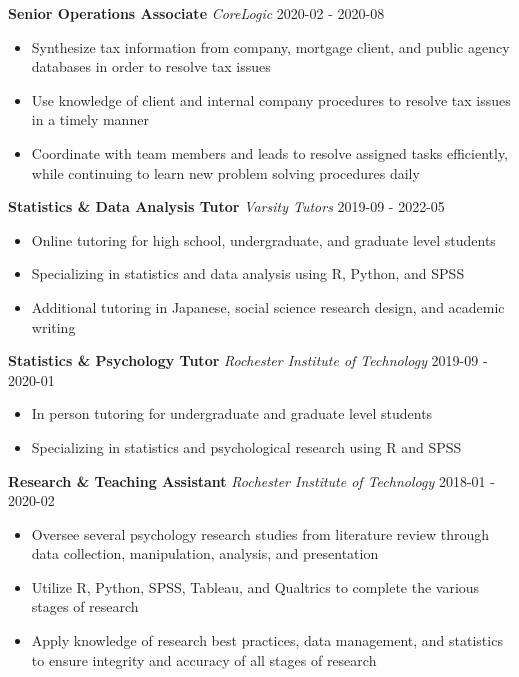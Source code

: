\documentclass[a4paper,9pt]{extarticle}
\begin{document}
\noindent
\textbf{Senior Operations Associate}
\noindent
\textit{CoreLogic} \hfill 2020-02 - 2020-08
\begin{itemize}
\item Synthesize tax information from company, mortgage client, and public agency databases in order to resolve tax issues
\item Use knowledge of client and internal company procedures to resolve tax issues in a timely manner
\item Coordinate with team members and leads to resolve assigned tasks efficiently, while continuing to learn new problem solving procedures daily
\end{itemize}

\noindent
\textbf{Statistics \& Data Analysis Tutor}
\noindent
\textit{Varsity Tutors} \hfill 2019-09 - 2022-05
\begin{itemize}
\item Online tutoring for high school, undergraduate, and graduate level students
\item Specializing in statistics and data analysis using R, Python, and SPSS
\item Additional tutoring in Japanese, social science research design, and academic writing
\end{itemize}

\noindent
\textbf{Statistics \& Psychology Tutor}
\noindent
\textit{Rochester Institute of Technology} \hfill 2019-09 - 2020-01
\begin{itemize}
\item In person tutoring for undergraduate and graduate level students
\item Specializing in statistics and psychological research using R and SPSS
\end{itemize}

\noindent
\textbf{Research \& Teaching Assistant}
\noindent
\textit{Rochester Institute of Technology} \hfill 2018-01 - 2020-02
\begin{itemize}
\item Oversee several psychology research studies from literature review through data collection, manipulation, analysis, and presentation
\item Utilize R, Python, SPSS, Tableau, and Qualtrics to complete the various stages of research
\item Apply knowledge of research best practices, data management, and statistics to ensure integrity and accuracy of all stages of research
\end{itemize}
\end{document}
